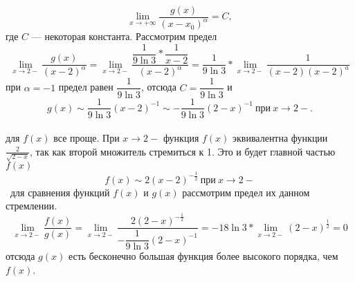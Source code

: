 \documentclass[12pt]{article}
\begin{document}
$$
\lim\limits_{x\rightarrow+\infty}\dfrac{g(x)}{(x-x_{0})^{\alpha}} = C,
$$
где $C$ --- некоторая константа. Рассмотрим предел
$$
\lim\limits_{x\rightarrow2-}\dfrac{g(x)}{(x-2)^\alpha}=\lim\limits_{x\rightarrow2-}\dfrac{\dfrac{1}{9\ln{3}}*\dfrac{1}{x-2}}{(x-2)^\alpha}=\dfrac{1}{9\ln{3}}*\lim\limits_{x\rightarrow2-}\dfrac{1}{(x-2)(x-2)^a}
$$
при $\alpha=-1$ предел равен $\dfrac{1}{9\ln{3}}$, отсюда $C=\dfrac{1}{9\ln{3}}$ и \\$$ g(x)\sim \dfrac{1}{9\ln{3}}(x-2)^{-1}\sim-\dfrac{1}{9\ln{3}}(2-x)^{-1}~\text{при}~x\rightarrow2-.$$
\\
для $f(x)$ все проще. При $x\rightarrow2-$ функция $f(x)$ эквивалентна функции $\frac{2}{\sqrt{2-x}}$, так как второй множитель стремиться к 1. Это и будет главной частью $f(x)$
$$ f(x)\sim2{(x-2)^{-\frac{1}{2}}}~\text{при}~x\rightarrow2-$$
~для сравнения функций $f(x)$ и $g(x)$ рассмотрим предел их данном стремлении.
$$
\lim\limits_{x\rightarrow2-}\dfrac{f(x)}{g(x)}=\lim\limits_{x\rightarrow2-}\dfrac{2(2-x)^{-\frac{1}{2}}}{-\dfrac{1}{9\ln{3}}(2-x)^{-1}}=-18\ln{3}*\lim\limits_{x\rightarrow2-}(2-x)^{\frac{1}{2}}=0
$$
отсюда $g(x)$ есть бесконечно большая функция более высокого порядка, чем $f(x)$.
\end{document}
